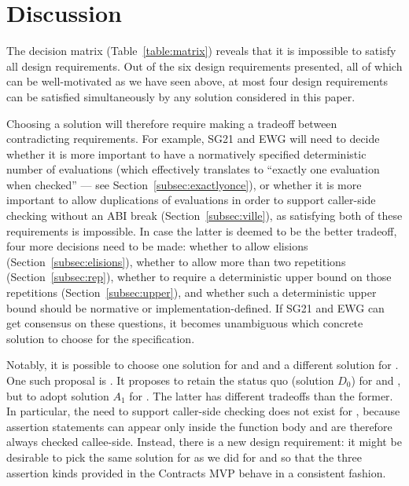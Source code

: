 
\section{Discussion}

The decision matrix (Table~\ref{table:matrix}) reveals that it is impossible to satisfy all design requirements. Out of the six design requirements presented, all of which can be well-motivated as we have seen above, at most four design requirements can be satisfied simultaneously by any solution considered in this paper.

Choosing a solution will therefore require making a tradeoff between  contradicting requirements. For example, SG21 and EWG will need to decide  whether it is more important to have a normatively specified deterministic number of evaluations (which effectively translates to ``exactly one evaluation when checked'' --- see Section~\ref{subsec:exactlyonce}), or whether it is more important to allow duplications of evaluations in order to support caller-side checking without an ABI break (Section~\ref{subsec:ville}), as satisfying both of these requirements is impossible. In case the latter is deemed to be the better tradeoff, four more decisions need to be made: whether to allow elisions (Section~\ref{subsec:elisions}), whether to allow more than two repetitions (Section~\ref{subsec:rep}), whether to require a deterministic upper bound on those repetitions (Section~\ref{subsec:upper}), and whether such a deterministic upper bound should be normative or implementation-defined. If SG21 and EWG can get consensus on these questions, it becomes unambiguous which concrete solution to choose for the specification.

Notably, it is possible to choose one solution for  and  and a different solution for \mbox{}. One such proposal is \cite{P3257R0}. It proposes to retain the status quo (solution $D_0$) for  and , but to adopt solution $A_1$ for . The latter has different tradeoffs than the former. In particular, the need to support caller-side checking does not exist for , because assertion statements can appear only inside the function body and are therefore always checked callee-side. Instead, there is a new design requirement: it might be desirable to pick the same solution for  as we did for  and  so that the three assertion kinds provided in the Contracts MVP behave in a consistent fashion.

